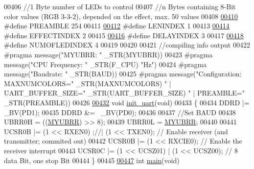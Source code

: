 \begin{DoxyCode}
{00406 \textcolor{comment}{//1 Byte number of LEDs to control}
00407 \textcolor{comment}{//n Bytes containing 8-Bit color values (RGB 3-3-2), depended on the effect, max. 50 values}
00408 
\hypertarget{ws2811lichterkette_8c_source_l00410}{}\hyperlink{ws2811lichterkette_8c_a8aac8c5098aaf915463fb31715efa09f}{00410} \textcolor{preprocessor}{#define PREAMBLE 254        }
00411 
\hypertarget{ws2811lichterkette_8c_source_l00412}{}\hyperlink{ws2811lichterkette_8c_aec9ae4a8d59e838ac8ed93ad0de8e827}{00412} \textcolor{preprocessor}{#define LENINDEX 1          }
00413 
\hypertarget{ws2811lichterkette_8c_source_l00414}{}\hyperlink{ws2811lichterkette_8c_a8d4e4cf47dd6136ace963623e1a8e27c}{00414} \textcolor{preprocessor}{#define EFFECTINDEX 2       }
00415 
\hypertarget{ws2811lichterkette_8c_source_l00416}{}\hyperlink{ws2811lichterkette_8c_a9ff437877d0878dd16eacf103a1e1c40}{00416} \textcolor{preprocessor}{#define DELAYINDEX 3        }
00417 
\hypertarget{ws2811lichterkette_8c_source_l00418}{}\hyperlink{ws2811lichterkette_8c_afbc75dc20761a05dda7cbb70b9b322dd}{00418} \textcolor{preprocessor}{#define NUMOFLEDINDEX 4     }
00419 
00420 
00421 \textcolor{comment}{//compiling info output}
00422 \textcolor{preprocessor}{#pragma message("MYUBRR: " \_STR(MYUBRR))}
00423 \textcolor{preprocessor}{#pragma message("CPU Frequency: " \_STR(F\_CPU) "Hz")}
00424 \textcolor{preprocessor}{#pragma message("Baudrate: " \_STR(BAUD))}
00425 \textcolor{preprocessor}{#pragma message("Configuration: MAXNUMCOLORS=" \_STR(MAXNUMCOLORS)  " | UART\_BUFFER\_SIZE="
       \_STR(UART\_BUFFER\_SIZE) " | PREAMBLE=" \_STR(PREAMBLE))}
00426 
\hypertarget{ws2811lichterkette_8c_source_l00432}{}\hyperlink{ws2811lichterkette_8c_ac7b3df0fa68526d64c732d5f916e34b1}{00432} \textcolor{keywordtype}{void} \hyperlink{ws2811lichterkette_8c_ac7b3df0fa68526d64c732d5f916e34b1}{init\_uart}(\textcolor{keywordtype}{void})
00433 \{
00434     DDRD |= \_BV(PD1);
00435     DDRD &= ~\_BV(PD0);
00436     
00437      \textcolor{comment}{//Set BAUD}
00438      UBRR0H = ((\hyperlink{ws2811lichterkette_8c_a711e9130c825a7269c8c87dbb57a85e0}{MYUBRR}) >> 8);
00439      UBRR0L = \hyperlink{ws2811lichterkette_8c_a711e9130c825a7269c8c87dbb57a85e0}{MYUBRR};
00440      
00441      UCSR0B |= (1 << RXEN0) ;\textcolor{comment}{//| (1 << TXEN0);      // Enable receiver (and transmitter; commited out)}
00442      UCSR0B |= (1 << RXCIE0);                       \textcolor{comment}{// Enable the receiver interrupt}
00443      UCSR0C |= (1 << UCSZ01) | (1 << UCSZ00);       \textcolor{comment}{// 8 data Bit, one stop Bit}
00444 \}
00445 
\hypertarget{ws2811lichterkette_8c_source_l00447}{}\hyperlink{ws2811lichterkette_8c_a840291bc02cba5474a4cb46a9b9566fe}{00447} \textcolor{keywordtype}{int} \hyperlink{ws2811lichterkette_8c_a840291bc02cba5474a4cb46a9b9566fe}{main}(\textcolor{keywordtype}{void})
}
\end{DoxyCode}
